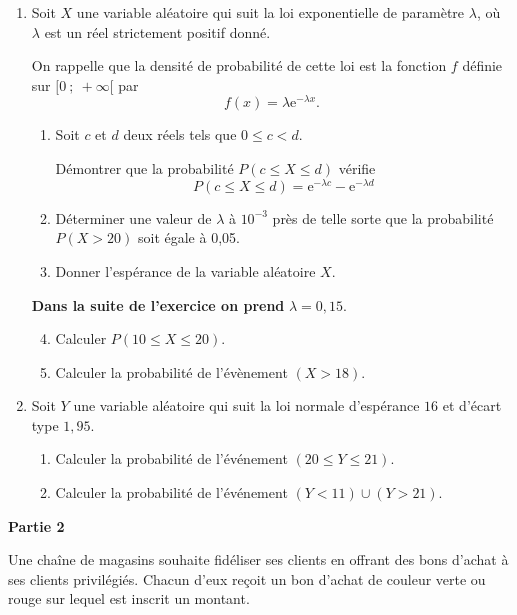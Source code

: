 \documentclass[10pt]{article}
\begin{document}
\begin{enumerate}
\item Soit $X$ une variable aléatoire qui suit la loi exponentielle de paramètre $\lambda$, où $\lambda$ est un réel strictement positif donné.

On rappelle que la densité de probabilité de cette loi est la fonction $f$  définie sur
$[0~;~+ \infty[$ par 
\[f(x) = \lambda\text{e}^{- \lambda x}.\]

	\begin{enumerate}
		\item Soit $c$ et $d$ deux réels tels que $0 \leqslant c < d$.
		
Démontrer que la probabilité $P( c \leqslant X \leqslant d)$ vérifie 
\[P(c \leqslant X \leqslant d) = \text{e}^{- \lambda c}   - \text{e}^{- \lambda d}\]
		\item Déterminer une valeur de $\lambda$ à $10^{-3}$ près de telle sorte que la probabilité $P(X > 20)$ soit égale à 0,05.
		\item Donner l'espérance de la variable aléatoire $X$.

\end{enumerate}
		
\textbf{Dans la suite de l'exercice on prend } \boldmath$\lambda = 0,15$\unboldmath.

\begin{enumerate}
\setcounter{enumii}{3}
		\item Calculer $P(10 \leqslant X \leqslant 20)$.
		\item Calculer la probabilité de l'évènement $(X > 18)$.
	\end{enumerate}
\item Soit $Y$ une variable aléatoire qui suit la loi normale d'espérance $16$ et d'écart type $1,95$.
	\begin{enumerate}
		\item Calculer la probabilité de l'événement $(20 \leqslant Y \leqslant 21)$.
		\item Calculer la probabilité de l'événement $(Y < 11) \cup (Y > 21)$.
	\end{enumerate}
\end{enumerate}

\bigskip
	
\textbf{Partie 2}
	
	\medskip
	
Une chaîne de magasins souhaite fidéliser ses clients en offrant des bons d'achat à ses clients
privilégiés. Chacun d'eux reçoit un bon d'achat de couleur verte ou rouge sur lequel est inscrit un montant.
	
\end{document}
